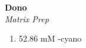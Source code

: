 \textbf{Dono} 
\\
\textit{Matrix Prep}
\begin{enumerate}
\item{52.86 mM \alpha-cyano}
\end{enumerate}
